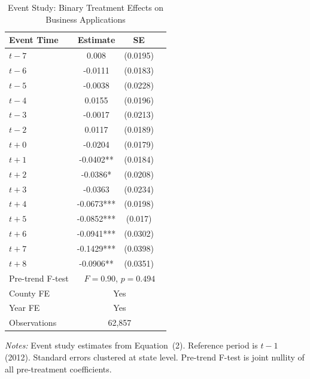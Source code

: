 \begin{table}[htbp]
\centering
\caption{Event Study: Binary Treatment Effects on Business Applications}
\label{tab:eventstudy}
\begin{tabular}{lccc}
\hline\hline
Event Time & Estimate & SE & \\
\hline
$t-7$ & 0.008 & (0.0195) & \\
$t-6$ & -0.0111 & (0.0183) & \\
$t-5$ & -0.0038 & (0.0228) & \\
$t-4$ & 0.0155 & (0.0196) & \\
$t-3$ & -0.0017 & (0.0213) & \\
$t-2$ & 0.0117 & (0.0189) & \\
$t+0$ & -0.0204 & (0.0179) & \\
$t+1$ & -0.0402** & (0.0184) & \\
$t+2$ & -0.0386* & (0.0208) & \\
$t+3$ & -0.0363 & (0.0234) & \\
$t+4$ & -0.0673*** & (0.0198) & \\
$t+5$ & -0.0852*** & (0.017) & \\
$t+6$ & -0.0941*** & (0.0302) & \\
$t+7$ & -0.1429*** & (0.0398) & \\
$t+8$ & -0.0906** & (0.0351) & \\
\hline
Pre-trend F-test & \multicolumn{3}{c}{$F = 0.90$, $p = 0.494$} \\
County FE & \multicolumn{3}{c}{Yes} \\
Year FE & \multicolumn{3}{c}{Yes} \\
Observations & \multicolumn{3}{c}{62,857} \\
\hline\hline
\end{tabular}
\begin{tablenotes}[flushleft]\small
\item \textit{Notes:} Event study estimates from Equation~(2). Reference period is $t-1$ (2012). Standard errors clustered at state level. Pre-trend F-test is joint nullity of all pre-treatment coefficients.
\end{tablenotes}
\end{table}
